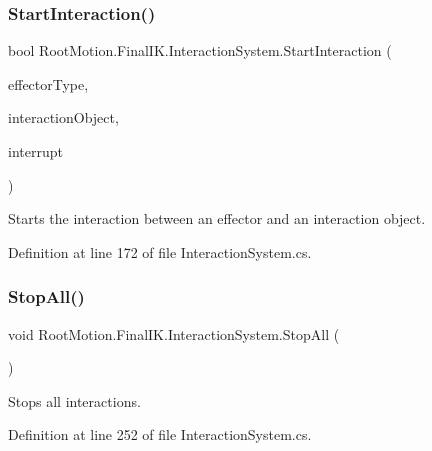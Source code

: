 \subsubsection{\texorpdfstring{Start\+Interaction()}{StartInteraction()}}
{\footnotesize\ttfamily bool Root\+Motion.\+Final\+I\+K.\+Interaction\+System.\+Start\+Interaction (\begin{DoxyParamCaption}\item[{\mbox{\hyperlink{namespace_root_motion_1_1_final_i_k_ae0dd2058c7667b6f132c11a6b860c14a}{Full\+Body\+Biped\+Effector}}}]{effector\+Type,  }\item[{\mbox{\hyperlink{class_root_motion_1_1_final_i_k_1_1_interaction_object}{Interaction\+Object}}}]{interaction\+Object,  }\item[{bool}]{interrupt }\end{DoxyParamCaption})}



Starts the interaction between an effector and an interaction object. 



Definition at line 172 of file Interaction\+System.\+cs.

\mbox{\label{class_root_motion_1_1_final_i_k_1_1_interaction_system_a225aa428c042588350f8724862e10a4f}} 
\subsubsection{\texorpdfstring{Stop\+All()}{StopAll()}}
{\footnotesize\ttfamily void Root\+Motion.\+Final\+I\+K.\+Interaction\+System.\+Stop\+All (\begin{DoxyParamCaption}{ }\end{DoxyParamCaption})}



Stops all interactions. 



Definition at line 252 of file Interaction\+System.\+cs.

\mbox{\label{class_root_motion_1_1_final_i_k_1_1_interaction_system_ac26ccf2f66ed2bbbf112b285651decf1}} 
